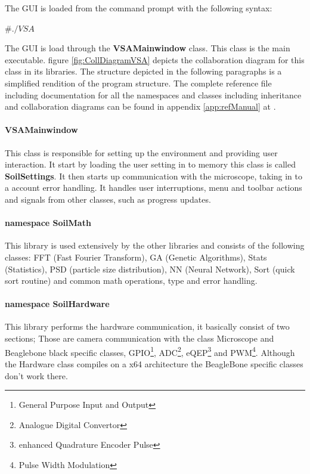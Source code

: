 \documentclass[11pt,fleqn,,a4paper,twoside,openright]{book}
\begin{document}
The GUI is loaded from the command prompt with the following syntax:
\begin{sBox}
	$\# ./VSA $
\end{sBox}

The GUI is load through the \textbf{VSAMainwindow} class. This class is the main executable. figure \ref{fig:CollDiagramVSA} depicts the collaboration diagram for this class in its libraries. The structure depicted in the following paragraphs is a simplified rendition of the program structure. The complete reference file including documentation for all the namespaces and classes including inheritance and collaboration diagrams can be found in appendix \ref{app:refManual} at \pageref{app:refManual}.

\paragraph{VSAMainwindow}
This class is responsible for setting up the environment and providing user interaction. It start by loading the user setting in to memory this class is called \textbf{SoilSettings}. It then starts up communication with the microscope, taking in to a account error handling. It handles user interruptions, menu and toolbar actions and signals from other classes, such as progress updates. 

\paragraph{namespace SoilMath}
This library is used extensively by the other libraries and consists of the following classes: FFT (Fast Fourier Transform), GA (Genetic Algorithms), Stats (Statistics), PSD (particle size distribution), NN (Neural Network), Sort (quick sort routine) and common math operations, type and error handling.

\paragraph{namespace SoilHardware}
This library performs the hardware communication, it basically consist of two sections; Those are camera communication with the class Microscope and Beaglebone black specific classes, GPIO\footnote{General Purpose Input and Output}, ADC\footnote{Analogue Digital Convertor}, eQEP\footnote{enhanced Quadrature Encoder Pulse} and PWM\footnote{Pulse Width Modulation}. Although the Hardware class compiles on a x64 architecture the BeagleBone specific classes don't work there.
\end{document}
